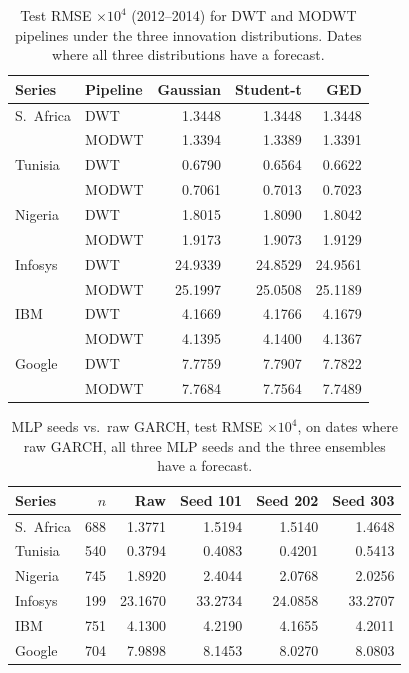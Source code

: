 \documentclass{article}
\begin{document}
\begin{table}[t]
\caption{Test RMSE $\times10^4$ (2012--2014) for DWT and MODWT pipelines under the three innovation distributions. Dates where all three distributions have a forecast.}
\label{tab:dist2}
\centering\small
\setlength{\tabcolsep}{3pt}
\begin{tabular}{llrrr}
\toprule
Series & Pipeline & Gaussian & Student-t & GED\\
\midrule
S.\ Africa & DWT & 1.3448 & 1.3448 & 1.3448\\
 & MODWT & 1.3394 & 1.3389 & 1.3391\\
Tunisia & DWT & 0.6790 & 0.6564 & 0.6622\\
 & MODWT & 0.7061 & 0.7013 & 0.7023\\
Nigeria & DWT & 1.8015 & 1.8090 & 1.8042\\
 & MODWT & 1.9173 & 1.9073 & 1.9129\\
Infosys & DWT & 24.9339 & 24.8529 & 24.9561\\
 & MODWT & 25.1997 & 25.0508 & 25.1189\\
IBM & DWT & 4.1669 & 4.1766 & 4.1679\\
 & MODWT & 4.1395 & 4.1400 & 4.1367\\
Google & DWT & 7.7759 & 7.7907 & 7.7822\\
 & MODWT & 7.7684 & 7.7564 & 7.7489\\
\bottomrule
\end{tabular}
\end{table}

\begin{table}[t]
\caption{MLP seeds vs.\ raw GARCH, test RMSE $\times10^4$, on dates where raw GARCH, all three MLP seeds and the three ensembles have a forecast.}
\label{tab:mlp}
\centering\small
\setlength{\tabcolsep}{3pt}
\begin{tabular}{lrrrrr}
\toprule
Series & $n$ & Raw & Seed 101 & Seed 202 & Seed 303\\
\midrule
S.\ Africa & 688 & 1.3771 & 1.5194 & 1.5140 & 1.4648\\
Tunisia & 540 & 0.3794 & 0.4083 & 0.4201 & 0.5413\\
Nigeria & 745 & 1.8920 & 2.4044 & 2.0768 & 2.0256\\
Infosys & 199 & 23.1670 & 33.2734 & 24.0858 & 33.2707\\
IBM & 751 & 4.1300 & 4.2190 & 4.1655 & 4.2011\\
Google & 704 & 7.9898 & 8.1453 & 8.0270 & 8.0803\\
\bottomrule
\end{tabular}
\end{table}
\end{document}
